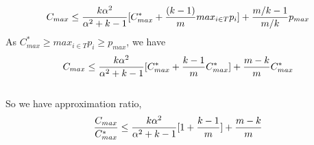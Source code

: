 \documentclass[10pt, conference, compsocconf]{IEEEtran}
\begin{document}
\begin{equation}{\nonumber}
C_{max} \leq \frac{k\alpha^{2}}{\alpha^{2}+k-1}[ C_{max}^{*}+\frac{(k-1)}{m} {max_{i \in T}}{{p_{i}}}] + {\frac{m/k-1}{m/k}} p_{max} 
\end{equation}
 As $C_{max}^{*}\geq {{max_{i \in T}}{p_{i}}}\geq p_{max}$, we have\\
\begin{equation}{\nonumber}
 C_{max} \leq \frac{k\alpha^{2}}{\alpha^{2}+k-1}[ C_{max}^{*}+ {\frac{k-1}{m}}{C_{max}^{*}}] + {\frac{m-k}{m}} C_{max}^{*} \end{equation} \\
 

 
 So we have approximation ratio,\\
 \begin{equation}{\nonumber}
\frac{C_{max}}{C_{max}^{*}} \leq \frac{k\alpha^{2}}{\alpha^{2}+k-1}[1+ {\frac{k-1}{m}} ]+ {\frac{m-k}{m}} \end{equation}







%
%

\end{document}
